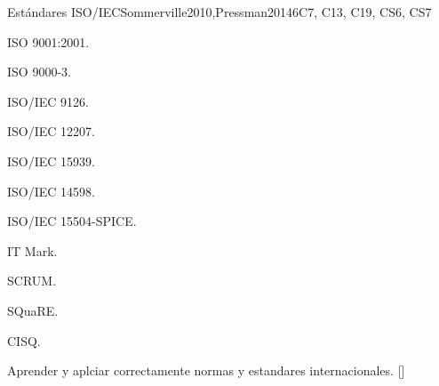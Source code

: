 \begin{syllabus}
\begin{unit}{Estándares ISO/IEC}{}{Sommerville2010,Pressman2014}{6}{C7, C13, C19, CS6, CS7}
\begin{topics}
    \item ISO 9001:2001.
    \item ISO 9000-3.
    \item ISO/IEC 9126.
    \item ISO/IEC 12207.
    \item ISO/IEC 15939.
    \item ISO/IEC 14598.
    \item ISO/IEC 15504-SPICE.
    \item IT Mark.
    \item SCRUM.
    \item SQuaRE.
    \item CISQ.
\end{topics}
\begin{learningoutcomes}%
    \item Aprender y aplciar correctamente normas y estandares internacionales. [\Usage]
\end{learningoutcomes}
\end{unit}

\begin{coursebibliography}
\end{coursebibliography}

\end{syllabus}
